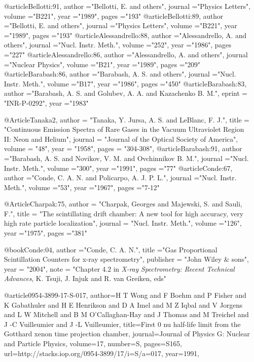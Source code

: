 @article{Bellotti:91,
	author	="Bellotti, E.  and others",
	journal	="Physics Letters",
	volume	="B221",
	year		="1989",
	pages	="193"
}
@article{Bellotti:89,
	author	="Bellotti, E.  and others",
	journal	="Physics Letters",
	volume	="B221",
	year		="1989",
	pages	="193"
}
@article{Alessandrello:88,
	author	="Alessandrello, A.  and others",
	journal	="Nucl. Instr. Meth.",
	volume	="252",
	year		="1986",
	pages	="227"
}
@article{Alessandrello:86,
	author	="Alessandrello, A.  and others",
	journal	="Nuclear Physics",
	volume	="B21",
	year		="1989",
	pages	="209"
}
@article{Barabash:86,
	author	="Barabash, A. S. and others",
	journal	="Nucl. Instr. Meth.",
	volume	="B17",
	year		="1986",
	pages	="450"
}
@article{Barabash:83,
	author	="Barabash, A. S. and Golubev, A. A. and Kazachenko B. M.",
	eprint    = "INR-P-0292",
	year		="1983"
}

@Article{Tanaka2,
     author    = "Tanaka, Y. Jursa, A. S.  and  LeBlanc, F. J.",
     title     = "{Continuous Emission Spectra of Rare Gases in the Vacuum Ultraviolet Region II: Neon and Helium}",
     journal   = "Journal of the Optical Society of America",
     volume    = "48",
     year      = "1958",
     pages     = "304-308",
}
@article{Barabash:91,
	author	="Barabash, A. S. and Novikov, V. M. and Ovchinnikov B. M.",
	journal	="Nucl. Instr. Meth.",
	volume	="300",
	year		="1991",
	pages	="77"
}
@article{Conde:67,
	author	="Conde, C. A. N.  and Policarpo, A. J. P. L.",
	journal	="Nucl. Instr. Meth.",
	volume	="53",
	year		="1967",
	pages	="7-12"
}

@Article{Charpak:75,
     author		= "Charpak, Georges and Majewski, S. and Sauli, F.",
     title     		= "{The scintillating drift chamber: A new tool for high
                  		accuracy, very  high rate particle localization}",
     journal   	= "Nucl. Instr. Meth.",
     volume    	="126",
     year      	="1975",
     pages     	="381"
}


@book{Conde:04,
     author    	="Conde, C. A. N.",
     title		="Gas Proportional Scintillation Counters for x-ray spectrometry",
     publisher   	= "John Wiley \& sons",
     year      	= "2004",
     note     		= "Chapter 4.2 in {\em X-ray Spectrometry: Recent Technical Advances}, K. Tsuji, 
			     J. Injuk and R. van Greiken, eds"
}

@article{0954-3899-17-S-017,
  author={H T Wong and F Boehm and P Fisher and K Gabathuler and H E Henrikson and D A Imel and M Z Iqbal and V Jorgens and L W Mitchell and B M
O'Callaghan-Hay and J Thomas and M Treichel and J -C Vuilleumier and J -L Vuilleumier},
  title={First 0 nu half-life limit from the Gotthard xenon time projection chamber},
  journal={Journal of Physics G: Nuclear and Particle Physics},
  volume={17},
  number={S},
  pages={S165},
  url={http://stacks.iop.org/0954-3899/17/i=S/a=017},
  year={1991},
}

